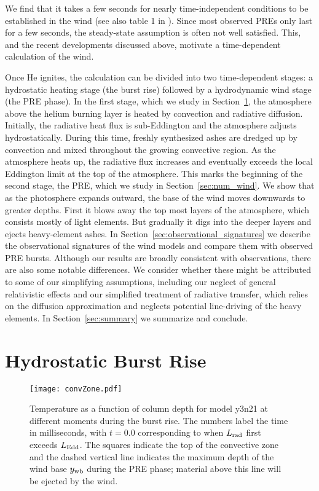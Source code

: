 \documentclass[apj,usenatbib, iop, twocolappendix]{emulateapj}
\newcommand{\Lrad}{L_{\rm rad}}
\newcommand{\Ledd}{L_{\rm Edd}}
\begin{document}
We find that it takes a few seconds for nearly time-independent conditions to be established in the wind (see also table 1 in \citealt{Joss:87}).  Since most observed PREs only last for a few seconds, the steady-state assumption is often not well satisfied. This, and the recent developments discussed above, motivate a time-dependent calculation of the wind.  

Once He ignites, the calculation can be divided into two time-dependent stages: a hydrostatic heating stage (the burst rise) followed by a hydrodynamic wind stage (the PRE phase).  In the first stage, which we study in Section~\ref{sec:num_mlt}, the atmosphere above the helium burning layer is heated by convection and radiative diffusion.  Initially, the radiative heat flux is sub-Eddington and the atmosphere adjusts hydrostatically.  During this time, freshly synthesized ashes are dredged up by convection and mixed throughout the growing  convective region.  As the atmosphere heats up, the radiative flux increases and eventually exceeds the local Eddington limit at the top of the atmosphere.  This marks the beginning of the second stage, the PRE, which we study in  Section~\ref{sec:num_wind}. We show that as the photosphere expands outward, the base of the wind moves downwards to greater depths. First it blows away the top most layers of the atmosphere, which consists mostly of light elements.  But gradually it digs into the deeper layers and ejects heavy-element ashes.  In Section~\ref{sec:observational_signatures} we describe the observational signatures of the wind models and compare them with observed PRE bursts. Although our results are broadly consistent with observations, there are also some notable differences.  We consider whether these might be attributed to some of our simplifying assumptions, including our neglect of general relativistic effects and our simplified treatment of radiative transfer, which relies on the diffusion approximation and neglects potential line-driving of the heavy elements.  In Section~\ref{sec:summary} we summarize and conclude.



\section{Hydrostatic Burst Rise}
\label{sec:num_mlt}


\begin{figure}
\texttt{[image: convZone.pdf]}
\caption{Temperature as a function of column depth for model y3n21  at different moments during the burst rise. The numbers label the time in milliseconds, with $t=0.0$ corresponding to when $\Lrad$ first exceeds $\Ledd$.  The squares indicate the top of the convective zone and the dashed vertical line indicates the maximum depth of the wind base $y_{\rm wb}$ during the PRE phase; material above this line will  be ejected by the wind.}
\label{fig:convZone}
\end{figure}
\end{document}
